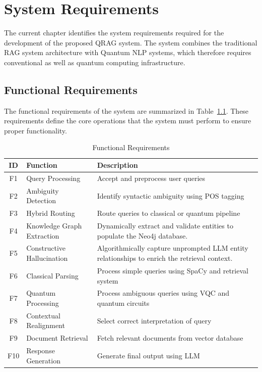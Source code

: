 \chapter{System Requirements}

The current chapter identifies the system requirements required for the development of the proposed QRAG system. The system combines the traditional RAG system architecture with Quantum NLP systems, which therefore requires conventional as well as quantum computing infrastructure.

\section{Functional Requirements}

The functional requirements of the system are summarized in Table~\ref{tab:functional_requirements}. These requirements define the core operations that the system must perform to ensure proper functionality.

\begin{table}[htbp]
    \vspace{-10em}
    \centering
    \caption{Functional Requirements}
    \label{tab:functional_requirements}
    \begin{tabular}{|c|p{5cm}|p{6cm}|}
        \hline
        \textbf{ID} & \textbf{Function} & \textbf{Description} \\
        \hline
        F1 & Query Processing & Accept and preprocess user queries \\
        \hline
        F2 & Ambiguity Detection & Identify syntactic ambiguity using POS tagging \\
        \hline
        F3 & Hybrid Routing & Route queries to classical or quantum pipeline \\
        \hline
        F4 & Knowledge Graph Extraction & Dynamically extract and validate entities to populate the Neo4j database. \\
        \hline
        F5 & Constructive Hallucination & Algorithmically capture unprompted LLM entity relationships to enrich the retrieval context. \\
        \hline
        F6 & Classical Parsing & Process simple queries using SpaCy and retrieval system \\
        \hline
        F7 & Quantum Processing & Process ambiguous queries using VQC and quantum circuits \\
        \hline
        F8 & Contextual Realignment & Select correct interpretation of query \\
        \hline
        F9 & Document Retrieval & Fetch relevant documents from vector database \\
        \hline
        F10 & Response Generation & Generate final output using LLM \\
        \hline
    \end{tabular}
\end{table}

